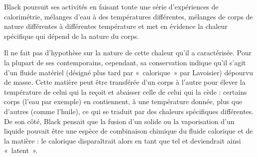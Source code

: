 	Black poursuit ses activités en faisant toute une série d'expériences de calorimétrie, mélanges d'eau à des températures différentes, mélanges de corps de nature différentes à différentes température et met en évidence la chaleur spécifique qui dépend de la nature du corps.

	Il ne fait pas d'hypothèse sur la nature de cette chaleur qu'il a caractérisée. Pour la plupart de ses contemporains, cependant, sa conservation indique qu'il s'agit d'un fluide matériel (désigné plus tard par «~calorique~» par Lavoisier) dépourvu de masse. Cette matière peut être transférée d'un corps à l'autre pour élever la température de celui qui la reçoit et abaisser celle de celui qui la cède : certains corps (l'eau par exemple) en contiennent, à une température donnée, plus que d'autres (comme l'huile), ce qui se traduit par des chaleurs spécifiques différentes. De son côté, Black pensait que la fusion d'un solide ou la vaporisation d'un liquide pouvait être une espèce de combinaison chimique du fluide calorique et de la matière : le calorique disparaîtrait alors en tant que tel et deviendrait ainsi «~latent~»\cite{locqueneux1996}.

\atendofhistorysection
